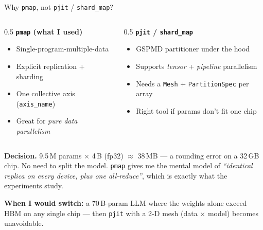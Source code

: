 \documentclass[aspectratio=169,10pt]{beamer}
\begin{document}
\begin{frame}{Why \texttt{pmap}, not \texttt{pjit} / \texttt{shard\_map}?}
  \begin{columns}[T,onlytextwidth]
    \begin{column}{0.5\textwidth}
      \textbf{\texttt{pmap} (what I used)}
      \begin{itemize}
        \item Single-program-multiple-data
        \item Explicit replication + sharding
        \item One collective axis (\texttt{axis\_name})
        \item Great for \emph{pure data parallelism}
      \end{itemize}
    \end{column}
    \begin{column}{0.5\textwidth}
      \textbf{\texttt{pjit} / \texttt{shard\_map}}
      \begin{itemize}
        \item GSPMD partitioner under the hood
        \item Supports \emph{tensor} + \emph{pipeline} parallelism
        \item Needs a \texttt{Mesh} + \texttt{PartitionSpec} per array
        \item Right tool if params don't fit one chip
      \end{itemize}
    \end{column}
  \end{columns}

  \vspace{0.4em}
  \textbf{Decision.} 9.5\,M params $\times$ 4\,B (fp32) $\approx$ 38\,MB — a rounding error
  on a 32\,GB chip. No need to split the model. \texttt{pmap} gives me the mental model
  of \emph{``identical replica on every device, plus one all-reduce''}, which is exactly
  what the experiments study.

  \vspace{0.4em}
  \textbf{When I would switch:} a 70\,B-param LLM where the weights alone exceed HBM on
  any single chip — then \texttt{pjit} with a 2-D mesh (data $\times$ model) becomes
  unavoidable.
\end{frame}
\end{document}
